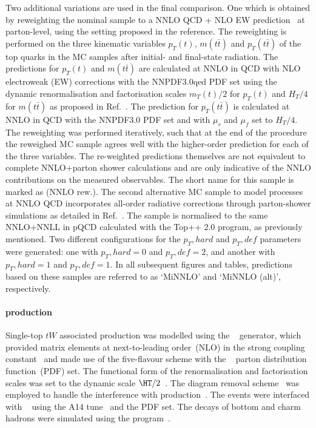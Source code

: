 Two additional \ttbar variations are used in the final
comparison. One which is obtained by reweighting the nominal \ttbar sample
to a NNLO QCD + NLO EW prediction~\cite{Czakon:2017wor} at parton-level,
using the setting proposed in the reference. The reweighting is performed
on the three kinematic variables \(p_T(t)\), \(m(t\bar{t})\) and \(p_T(t\bar{t})\)
of the top quarks in the MC samples after initial- and final-state radiation.
The predictions for \(p_T(t)\) and \(m(t\bar{t})\) are calculated at NNLO in
QCD with NLO electroweak (EW) corrections with the NNPDF3.0qed PDF set using
the dynamic renormalisation and factorisation scales \(m_T(t)/2\) for
\(p_T(t)\) and \(H_T/4\) for \(m(t\bar{t})\) as proposed in Ref.~\cite{Czakon:2017wor}.
The prediction for \(p_T(t\bar{t})\) is calculated at NNLO in QCD with the
NNPDF3.0 PDF set and with \(\mu_r\) and \(\mu_f\) set to \(H_T/4\).
The reweighting was performed iteratively, such that at the end of the procedure
the reweighed MC sample agrees well with the higher-order prediction for each
of the three variables. The re-weighted predictions themselves are not
equivalent to complete NNLO+parton shower calculations and are only indicative
of the NNLO contributions on the measured observables. The short name for this
sample is marked as  (NNLO rew.).
The second alternative MC sample  to model \ttbar processes at NNLO QCD
incorporates all-order radiative corrections through parton-shower simulations
as detailed in Ref.~\cite{Mazzitelli:2020jio}.
The sample is normalised to the same NNLO+NNLL in pQCD calculated with
the Top++ 2.0 program, as previously mentioned.
Two  different
configurations for the \(p_T,hard\) and \(p_T,def\) parameters were generated:
one with \(p_T,hard = 0\) and \(p_T,def = 2\), and another with \(p_T,hard = 1\)
and \(p_T,def = 1\). In all subsequent figures and tables, predictions based
on these samples are referred to as `MiNNLO' and `MiNNLO (alt)', respectively.





\paragraph*{\tW production}

Single-top \(tW\) associated production was modelled using the
\POWHEGBOX[v2]~\cite{Re:2010bp,Nason:2004rx,Frixione:2007vw,Alioli:2010xd}
generator, which provided matrix elements at next-to-leading
order~(NLO) in the strong coupling constant \alphas\ and made use of the five-flavour
scheme with the \NNPDF[3.0nlo]~\cite{Ball:2014uwa} parton
distribution function~(PDF) set.
The functional form of the renormalisation and factorisation scales was
set to the dynamic scale \( \HT / 2 \)~\cite{ATL-PHYS-PUB-2021-042}.
The diagram removal scheme~\cite{Frixione:2008yi} was employed to handle the
interference with \ttbar production~\cite{ATL-PHYS-PUB-2016-020}.
The events were interfaced with \PYTHIA[8.230]~\cite{Sjostrand:2014zea}
using the A14 tune~\cite{ATL-PHYS-PUB-2014-021} and the \NNPDF[2.3lo] PDF set.
The decays of bottom and charm hadrons were simulated using the
\EVTGEN[1.6.0] program~\cite{Lange:2001uf}.

